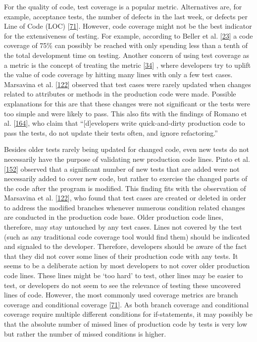 \documentclass[]{book}
\begin{document}
For the quality of code, test coverage is a popular metric. Alternatives
are, for example, acceptance tests, the number of defects in the last
week, or defects per Line of Code (LOC)
{[}\protect\hyperlink{ref-GAROUSI20131354}{71}{]}. However, code
coverage might not be the best indicator for the extensiveness of
testing. For example, according to Beller et al.
{[}\protect\hyperlink{ref-Beller:2015:DT:2819009.2819101}{23}{]} a code
coverage of 75\% can possibly be reached with only spending less than a
tenth of the total development time on testing. Another concern of using
test coverage as a metric is the concept of treating the metric
{[}\protect\hyperlink{ref-bouwers2012a}{34}{]} , where developers try to
uplift the value of code coverage by hitting many lines with only a few
test cases. Marsavina et al.
{[}\protect\hyperlink{ref-marsavina2014}{122}{]} observed that test
cases were rarely updated when changes related to attributes or methods
in the production code were made. Possible explanations for this are
that these changes were not significant or the tests were too simple and
were likely to pass. This also fits with the findings of Romano et al.
{[}\protect\hyperlink{ref-ROMANO201764}{164}{]}, who claim that
``{[}d{]}evelopers write quick-and-dirty production code to pass the
tests, do not update their tests often, and ignore refactoring.''

Besides older tests rarely being updated for changed code, even new
tests do not necessarily have the purpose of validating new production
code lines. Pinto et al.
{[}\protect\hyperlink{ref-pinto2012understanding}{152}{]} observed that
a significant number of new tests that are added were not necessarily
added to cover new code, but rather to exercise the changed parts of the
code after the program is modified. This finding fits with the
observation of Marsavina et al.
{[}\protect\hyperlink{ref-marsavina2014}{122}{]}, who found that test
cases are created or deleted in order to address the modified branches
whenever numerous condition related changes are conducted in the
production code base. Older production code lines, therefore, may stay
untouched by any test cases. Lines not covered by the test (such as any
traditional code coverage tool would find them) should be indicated and
signaled to the developer. Therefore, developers should be aware of the
fact that they did not cover some lines of their production code with
any tests. It seems to be a deliberate action by most developers to not
cover older production code lines. These lines might be `too hard' to
test, other lines may be easier to test, or developers do not seem to
see the relevance of testing these uncovered lines of code. However, the
most commonly used coverage metrics are branch coverage and conditional
coverage {[}\protect\hyperlink{ref-GAROUSI20131354}{71}{]}. As both
branch coverage and conditional coverage require multiple different
conditions for if-statements, it may possibly be that the absolute
number of missed lines of production code by tests is very low but
rather the number of missed conditions is higher.
\end{document}
